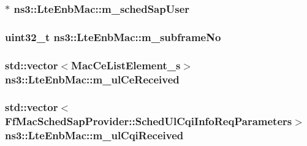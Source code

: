 \subsubsection[{\texorpdfstring{m\+\_\+sched\+Sap\+User}{m_schedSapUser}}]{$\ast$ ns3\+::\+Lte\+Enb\+Mac\+::m\+\_\+sched\+Sap\+User\hspace{0.3cm}{\ttfamily [private]}}\hypertarget{classns3_1_1LteEnbMac_a0b12a94bc3f8b8eb6403d403bca3a3f7}{}\label{classns3_1_1LteEnbMac_a0b12a94bc3f8b8eb6403d403bca3a3f7}
\subsubsection[{\texorpdfstring{m\+\_\+subframe\+No}{m_subframeNo}}]{\setlength{\rightskip}{0pt plus 5cm}uint32\+\_\+t ns3\+::\+Lte\+Enb\+Mac\+::m\+\_\+subframe\+No\hspace{0.3cm}{\ttfamily [private]}}\hypertarget{classns3_1_1LteEnbMac_adccfd57ac8aedd1182963517546fde38}{}\label{classns3_1_1LteEnbMac_adccfd57ac8aedd1182963517546fde38}
\subsubsection[{\texorpdfstring{m\+\_\+ul\+Ce\+Received}{m_ulCeReceived}}]{\setlength{\rightskip}{0pt plus 5cm}std\+::vector$<${\bf Mac\+Ce\+List\+Element\+\_\+s}$>$ ns3\+::\+Lte\+Enb\+Mac\+::m\+\_\+ul\+Ce\+Received\hspace{0.3cm}{\ttfamily [private]}}\hypertarget{classns3_1_1LteEnbMac_a5e182e74ebecda87f3d149da2840d4bd}{}\label{classns3_1_1LteEnbMac_a5e182e74ebecda87f3d149da2840d4bd}
\subsubsection[{\texorpdfstring{m\+\_\+ul\+Cqi\+Received}{m_ulCqiReceived}}]{\setlength{\rightskip}{0pt plus 5cm}std\+::vector$<${\bf Ff\+Mac\+Sched\+Sap\+Provider\+::\+Sched\+Ul\+Cqi\+Info\+Req\+Parameters}$>$ ns3\+::\+Lte\+Enb\+Mac\+::m\+\_\+ul\+Cqi\+Received\hspace{0.3cm}{\ttfamily [private]}}\hypertarget{classns3_1_1LteEnbMac_a663195c0f6c73d6c6aa8e578a6df032a}{}\label{classns3_1_1LteEnbMac_a663195c0f6c73d6c6aa8e578a6df032a}

